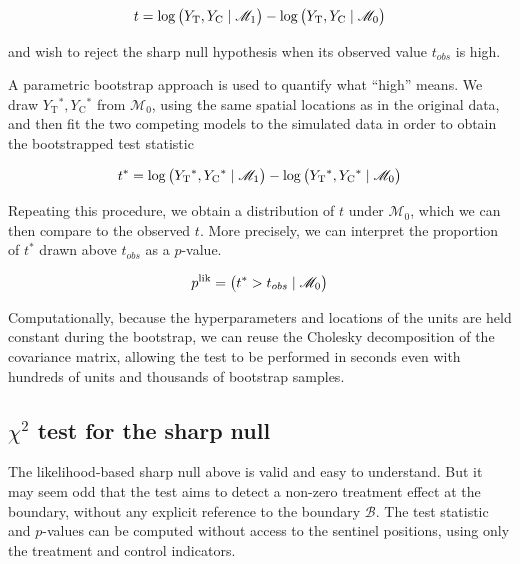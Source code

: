 \documentclass[letter]{article}
\let\Pr\relax
\DeclareMathOperator{\Pr}{\mathbb{P}}
\newcommand{\treat}{\mathrm{T}}
\newcommand{\ctrol}{\mathrm{C}}
\newcommand{\boundary}{\mathcal{B}}
\newcommand{\modnull}{\mathscr{M}_0}
\newcommand{\modalt}{\mathscr{M}_1}
\begin{document}
\begin{equation}
    t = \log \Pr\del{Y_\treat{}, Y_\ctrol{} \mid \modalt} - \log \Pr\del{Y_\treat{}, Y_\ctrol{} \mid \modnull}
\end{equation}

and wish to reject the sharp null hypothesis when its observed value \(t_{obs}\) is high.

A parametric bootstrap approach is used to quantify what ``high'' means. We draw \(Y_\treat{}^*,Y_\ctrol{}^*\) from \(\modnull\),
using the same spatial locations as in the original data,
and then fit the two competing models to the simulated data in order to obtain the bootstrapped test statistic

\begin{equation}
    t^* = \log \Pr\del{Y_\treat{}^*, Y_\ctrol{}^* \mid \modalt} - \log \Pr\del{Y_\treat{}^*, Y_\ctrol{}^* \mid \modnull}
\end{equation}

Repeating this procedure, we obtain a distribution of \(t\) under \(\modnull\),
which we can then compare to the observed \(t\).
More precisely, we can interpret the proportion of \(t^*\) drawn above \(t_{obs}\) as a \(p\)-value.

\begin{equation}
    p^{\mathrm{lik}} = \Pr\del{t^* > t_{obs} \mid \modnull}
\end{equation}

Computationally, because the hyperparameters and locations of the units are held constant during the bootstrap, we can reuse the Cholesky decomposition of the covariance matrix, allowing the test to be performed in seconds even with hundreds of units and thousands of bootstrap samples.
    


    	\subsection{\texorpdfstring{\(\chi^2\) test for the sharp null}{\textbackslash{}chi\^{}2 test for the sharp null}}\label{chi2-test-for-the-sharp-null}

The likelihood-based sharp null above is valid and easy to understand.
But it may seem odd that the test aims to detect a non-zero treatment effect at the boundary, without any explicit reference to the boundary \(\boundary\). The test statistic and \(p\)-values can be computed without access to the sentinel positions, using only the treatment and control indicators.
\end{document}
